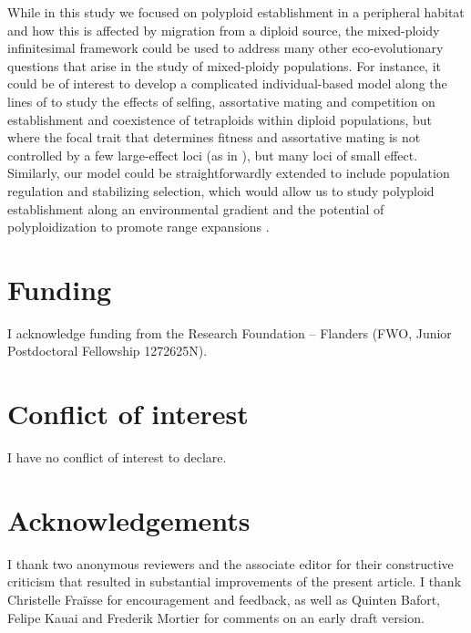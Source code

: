 \documentclass[12pt,a4paper]{article}
\begin{document}
While in this study we focused on polyploid establishment in a peripheral
habitat and how this is affected by migration from a diploid source, the
mixed-ploidy infinitesimal framework could be used to address many other
eco-evolutionary questions that arise in the study of mixed-ploidy populations.
For instance, it could be of interest to develop a complicated individual-based
model along the lines of \cite{oswald2011} to study the effects of selfing,
assortative mating and competition on establishment and coexistence of
tetraploids within diploid populations, but where the focal trait that
determines fitness and assortative mating is not controlled by a few
large-effect loci (as in \cite{oswald2011}), but many loci of small effect.
Similarly, our model could be straightforwardly extended to include population
regulation and stabilizing selection, which would allow us to study polyploid
establishment along an environmental gradient and the potential of
polyploidization to promote range expansions \citep{polechova2015}.

\section*{Funding}

I acknowledge funding from the Research Foundation -- Flanders (FWO, Junior
Postdoctoral Fellowship 1272625N).

\section*{Conflict of interest}

I have no conflict of interest to declare.

\section*{Acknowledgements}

I thank two anonymous reviewers and the associate editor for their constructive
criticism that resulted in substantial improvements of the present article.
I thank Christelle Fraïsse for encouragement and feedback, as well as Quinten
Bafort, Felipe Kauai and Frederik Mortier for comments on an early draft
version.



\end{document}
